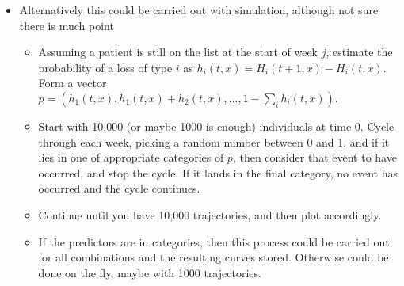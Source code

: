 \documentclass[12pt]{article}
\begin{document}
\begin{itemize}
\item Alternatively this could be carried out with simulation, although not sure there is much point
\begin{itemize}
\item Assuming a patient is still on the list at the start of week $j$, estimate the probability of a loss of type $i$ as $h_i(t,x) = H_i(t+1 , x) - H_i(t , x) $.  Form a vector 
$p=(h_1(t,x), h_1(t,x) + h_2(t,x), ..., 1- \sum_i h_i(t,x)).$\item Start with 10,000 (or maybe 1000 is enough) individuals at time 0.  Cycle through each week, picking a random number between 0 and 1, and if it lies in one of appropriate categories of $p$, then consider that event to have occurred, and stop the cycle.  If it lands in the final category, no event has occurred and the cycle continues.
\item Continue until you have 10,000 trajectories, and then plot accordingly.
\item If the predictors are in categories, then this process could be carried out for all combinations and the resulting curves stored.  Otherwise could be done on the fly, maybe with 1000 trajectories.
\end{itemize}

\end{itemize}

 



 
\end{document}
